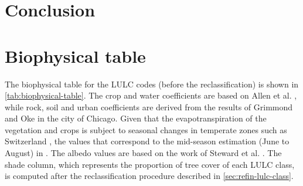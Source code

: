 \documentclass[12pt]{iopart}
\begin{document}
\section{Conclusion}


\appendix

\section{Biophysical table}
\label{sec:biophysical-table}

The biophysical table for the LULC codes (before the reclassification) is shown in \autoref{tab:biophysical-table}. The crop and water coefficients are based on Allen et al. \cite{allen1998crop}, while rock, soil and urban coefficients are derived from the results of Grimmond and Oke \cite{grimmond1999evapotranspiration} in the city of Chicago. Given that the evapotranspiration of the vegetation and crops is subject to seasonal changes in temperate zones such as Switzerland \cite{allen1998crop}, the values that correspond to the mid-season estimation (June to August) in \cite{nistor2016mapping}.
The albedo values are based on the work of Steward et al. \cite{stewart2012local}.
The shade column, which represents the proportion of tree cover of each LULC class, is computed after the reclassification procedure described in \autoref{sec:refin-lulc-class}.
\end{document}
